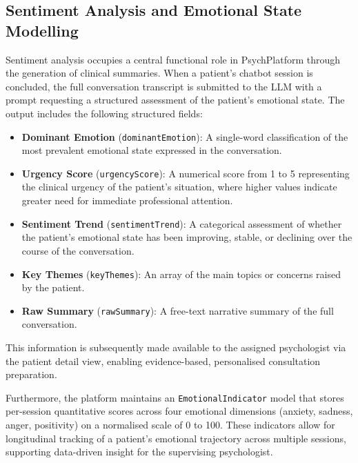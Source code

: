 \subsection{Sentiment Analysis and Emotional State Modelling}
\label{subsec:sentiment}

Sentiment analysis occupies a central functional role in PsychPlatform through
the generation of clinical summaries. When a patient's chatbot session is
concluded, the full conversation transcript is submitted to the LLM with a
prompt requesting a structured assessment of the patient's emotional state. The
output includes the following structured fields:

\begin{itemize}[leftmargin=1.5em, itemsep=4pt]
  \item \textbf{Dominant Emotion} (\texttt{dominantEmotion}): A single-word
        classification of the most prevalent emotional state expressed in the
        conversation.
  \item \textbf{Urgency Score} (\texttt{urgencyScore}): A numerical score from
        1 to 5 representing the clinical urgency of the patient's situation,
        where higher values indicate greater need for immediate professional
        attention.
  \item \textbf{Sentiment Trend} (\texttt{sentimentTrend}): A categorical
        assessment of whether the patient's emotional state has been improving,
        stable, or declining over the course of the conversation.
  \item \textbf{Key Themes} (\texttt{keyThemes}): An array of the main topics
        or concerns raised by the patient.
  \item \textbf{Raw Summary} (\texttt{rawSummary}): A free-text narrative
        summary of the full conversation.
\end{itemize}

This information is subsequently made available to the assigned psychologist via
the patient detail view, enabling evidence-based, personalised consultation
preparation.

Furthermore, the platform maintains an \texttt{EmotionalIndicator} model that
stores per-session quantitative scores across four emotional dimensions (anxiety,
sadness, anger, positivity) on a normalised scale of 0 to 100. These indicators
allow for longitudinal tracking of a patient's emotional trajectory across
multiple sessions, supporting data-driven insight for the supervising
psychologist.

